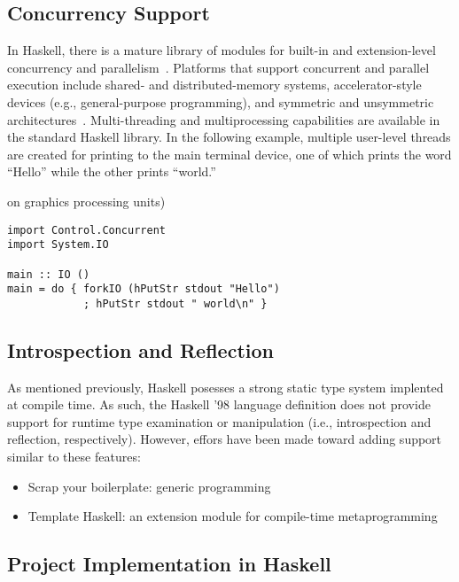 \documentclass[titlepage,12pt]{article}
\newcommand{\bi}{\begin{itemize}}
\newcommand{\ei}{\end{itemize}}
\begin{document}
\subsection{Concurrency Support}

In Haskell, there is a mature library of modules for built-in and extension-level
concurrency and parallelism~\cite{haskell-concurr}.  Platforms that support concurrent and parallel execution include shared- and
distributed-memory systems, accelerator-style devices (e.g., general-purpose programming), and
symmetric and unsymmetric architectures~\cite{par-funk}.  Multi-threading and multiprocessing capabilities are available in
the standard Haskell library.  In the following example, multiple user-level threads are created for printing
to the main terminal device, one of which prints the word ``Hello'' while the other prints ``world.''

on graphics processing units)
\begin{verbatim}
import Control.Concurrent
import System.IO

main :: IO ()
main = do { forkIO (hPutStr stdout "Hello")
            ; hPutStr stdout " world\n" }
\end{verbatim}

\subsection{Introspection and Reflection}

As mentioned previously, Haskell posesses a strong static type system
implented at compile time. As such, the Haskell '98 language definition
does not provide support for runtime type examination or manipulation
(i.e., introspection and reflection, respectively).  However, effors have been
made toward adding support similar to these features:
\bi
    \item Scrap your boilerplate: generic programming~\cite{haskell-syb}
    \item Template Haskell: an extension module for compile-time metaprogramming~\cite{haskell-th}
\ei


\newpage
\begin{appendices}
\section{Project Implementation in Haskell}
\inputminted{haskell}{src/InfixPostfix.hs}
\newpage
\inputminted{haskell}{src/InfixPostfixTest.hs}
\end{appendices}


\newpage


\end{document}
